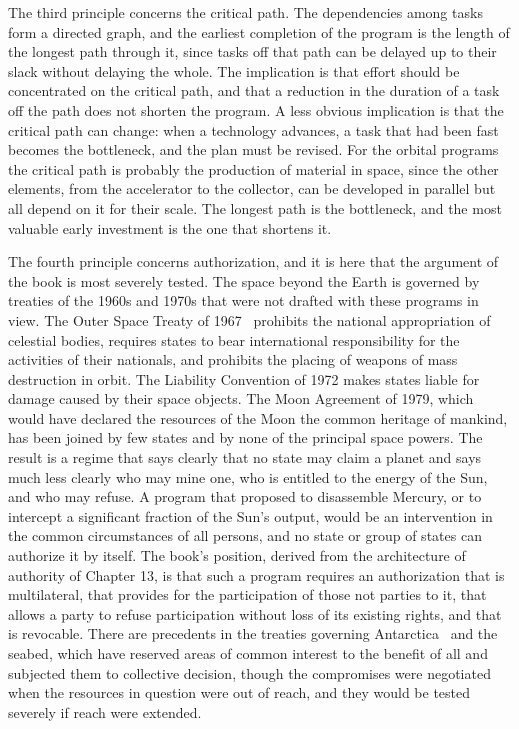 The third principle concerns the critical path. The dependencies among tasks form a directed graph, and the earliest completion of the program is the length of the longest path through it, since tasks off that path can be delayed up to their slack without delaying the whole. The implication is that effort should be concentrated on the critical path, and that a reduction in the duration of a task off the path does not shorten the program. A less obvious implication is that the critical path can change: when a technology advances, a task that had been fast becomes the bottleneck, and the plan must be revised. For the orbital programs the critical path is probably the production of material in space, since the other elements, from the accelerator to the collector, can be developed in parallel but all depend on it for their scale. The longest path is the bottleneck, and the most valuable early investment is the one that shortens it.

The fourth principle concerns authorization, and it is here that the argument of the book is most severely tested. The space beyond the Earth is governed by treaties of the 1960s and 1970s that were not drafted with these programs in view. The Outer Space Treaty of 1967~\cite{ost1967} prohibits the national appropriation of celestial bodies, requires states to bear international responsibility for the activities of their nationals, and prohibits the placing of weapons of mass destruction in orbit. The Liability Convention of 1972 makes states liable for damage caused by their space objects. The Moon Agreement of 1979, which would have declared the resources of the Moon the common heritage of mankind, has been joined by few states and by none of the principal space powers. The result is a regime that says clearly that no state may claim a planet and says much less clearly who may mine one, who is entitled to the energy of the Sun, and who may refuse. A program that proposed to disassemble Mercury, or to intercept a significant fraction of the Sun's output, would be an intervention in the common circumstances of all persons, and no state or group of states can authorize it by itself. The book's position, derived from the architecture of authority of Chapter 13, is that such a program requires an authorization that is multilateral, that provides for the participation of those not parties to it, that allows a party to refuse participation without loss of its existing rights, and that is revocable. There are precedents in the treaties governing Antarctica~\cite{antarctic1959} and the seabed, which have reserved areas of common interest to the benefit of all and subjected them to collective decision, though the compromises were negotiated when the resources in question were out of reach, and they would be tested severely if reach were extended.

